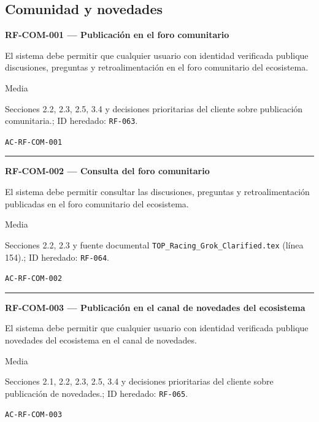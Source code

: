 \documentclass[10pt,letterpaper]{article}
\begin{document}
\subsection{Comunidad y novedades}
\noindent\textbf{RF-COM-001 --- Publicación en el foro comunitario}\par
\begin{description}[style=nextline,leftmargin=3.15cm,labelwidth=2.8cm,font=\normalfont\bfseries]
\item[Obligación] El sistema debe permitir que cualquier usuario con identidad verificada publique discusiones, preguntas y retroalimentación en el foro comunitario del ecosistema.
\item[Prioridad] Media
\item[Procedencia] Secciones 2.2, 2.3, 2.5, 3.4 y decisiones prioritarias del cliente sobre publicación comunitaria.; ID heredado: \texttt{RF-063}.
\item[Verificación] \texttt{AC-RF-COM-001}
\end{description}
\vspace{0.25em}\hrule\vspace{0.65em}
\noindent\textbf{RF-COM-002 --- Consulta del foro comunitario}\par
\begin{description}[style=nextline,leftmargin=3.15cm,labelwidth=2.8cm,font=\normalfont\bfseries]
\item[Obligación] El sistema debe permitir consultar las discusiones, preguntas y retroalimentación publicadas en el foro comunitario del ecosistema.
\item[Prioridad] Media
\item[Procedencia] Secciones 2.2, 2.3 y fuente documental \texttt{TOP\_Racing\_Grok\_Clarified.tex} (línea 154).; ID heredado: \texttt{RF-064}.
\item[Verificación] \texttt{AC-RF-COM-002}
\end{description}
\vspace{0.25em}\hrule\vspace{0.65em}
\noindent\textbf{RF-COM-003 --- Publicación en el canal de novedades del ecosistema}\par
\begin{description}[style=nextline,leftmargin=3.15cm,labelwidth=2.8cm,font=\normalfont\bfseries]
\item[Obligación] El sistema debe permitir que cualquier usuario con identidad verificada publique novedades del ecosistema en el canal de novedades.
\item[Prioridad] Media
\item[Procedencia] Secciones 2.1, 2.2, 2.3, 2.5, 3.4 y decisiones prioritarias del cliente sobre publicación de novedades.; ID heredado: \texttt{RF-065}.
\item[Verificación] \texttt{AC-RF-COM-003}
\end{description}
\end{document}
